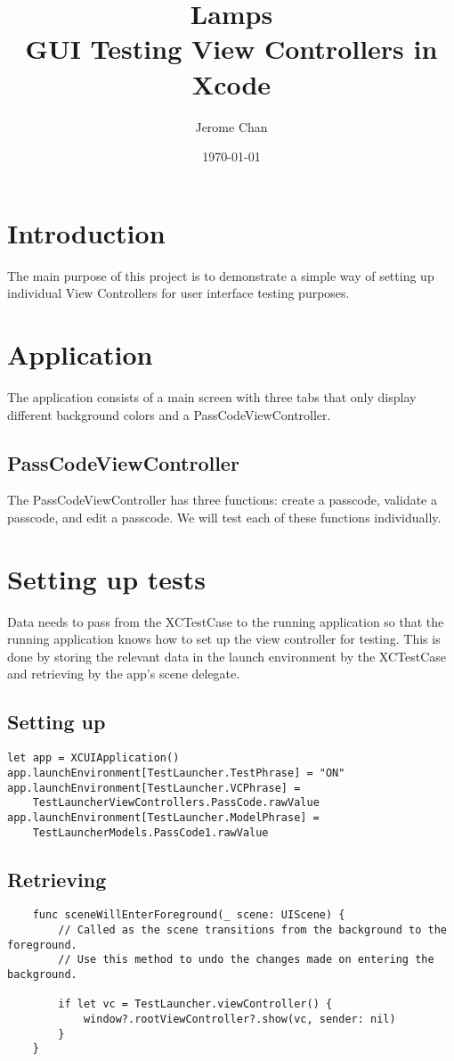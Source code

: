 \documentclass[10pt]{article}
\title{Lamps \\ GUI Testing View Controllers in Xcode}
\author{Jerome Chan}
\date{\today}                                           %
\begin{document}
\maketitle

\section{Introduction}
The main purpose of this project is to demonstrate a simple way of setting up individual View Controllers for user interface testing purposes.

\section{Application}
The application consists of a main screen with three tabs that only display different background colors and a PassCodeViewController.

\subsection{PassCodeViewController}
The PassCodeViewController has three functions: create a passcode, validate a passcode, and edit a passcode. We will test each of these functions individually.

\section{Setting up tests}
Data needs  to pass from the XCTestCase to the running application so that the running application knows how to set up the view controller for testing. This is done by storing the relevant data in the  launch environment by the XCTestCase and retrieving by the app's scene delegate.

\subsection{Setting up}
\begin{verbatim}
let app = XCUIApplication()
app.launchEnvironment[TestLauncher.TestPhrase] = "ON"
app.launchEnvironment[TestLauncher.VCPhrase] = 
    TestLauncherViewControllers.PassCode.rawValue
app.launchEnvironment[TestLauncher.ModelPhrase] = 
    TestLauncherModels.PassCode1.rawValue
\end{verbatim}

\subsection{Retrieving}
\begin{verbatim}
    func sceneWillEnterForeground(_ scene: UIScene) {
        // Called as the scene transitions from the background to the foreground.
        // Use this method to undo the changes made on entering the background.

        if let vc = TestLauncher.viewController() {
            window?.rootViewController?.show(vc, sender: nil)
        }
    }
\end{verbatim}
\end{document}
